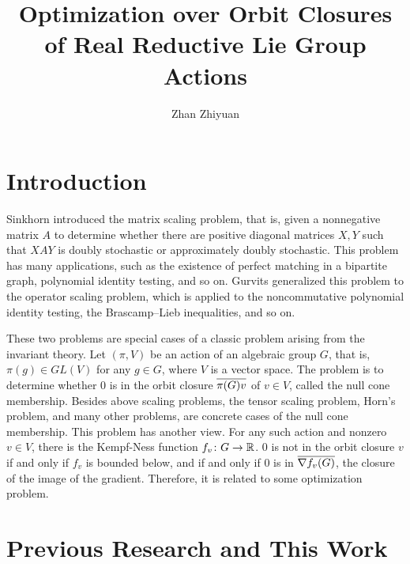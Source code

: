 \documentclass[papersize]{suribtabst}
\title{Optimization over Orbit Closures of Real Reductive Lie Group Actions}
\author{Zhan Zhiyuan}
\begin{document}
	\maketitle

	\section{Introduction}

	Sinkhorn \cite{key14} introduced the matrix scaling problem, that is, given a nonnegative matrix $A$ to determine whether there are positive diagonal matrices $X,Y$ such that $XAY$ is doubly stochastic or approximately doubly stochastic. This problem has many applications, such as the existence of perfect matching in a bipartite graph, polynomial identity testing, and so on. Gurvits \cite{key15} generalized this problem to the operator scaling problem, which is applied to the noncommutative polynomial identity testing, the Brascamp–Lieb inequalities, and so on. 

	These two problems are special cases of a classic problem arising from the invariant theory. Let $(\pi,V)$ be an action of an algebraic group $G$, that is, $\pi(g) \in GL(V)$ for any $g \in G$, where $V$ is a vector space. The problem is to determine whether $0$ is in the orbit closure $\overline{\pi(G)v}$ of $v\in V$, called the null cone membership. Besides above scaling problems, the tensor scaling problem, Horn's problem, and many other problems, are concrete cases of the null cone membership. This problem has another view. For any such action and nonzero $v \in V$, there is the Kempf-Ness function $f_v \colon G \rightarrow \mathbb{R}$. $0$ is not in the orbit closure $v$ if and only if $f_v$ is bounded below, and if and only if $0$ is in $\overline{\nabla f_v(G)}$, the closure of the image of the gradient. Therefore, it is related to some optimization problem.

	\section{Previous Research and This Work}
\end{document}
